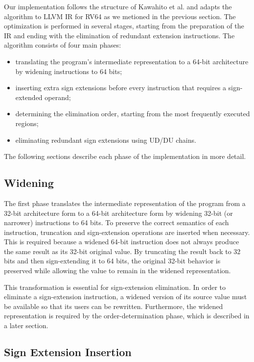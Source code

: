 \noindent Our implementation follows the structure of Kawahito et al. and adapts the algorithm to LLVM IR for RV64 as we metioned in the previous section. The optimization is performed in several stages, starting from the preparation of the IR and ending with the elimination of redundant extension instructions. The algorithm consists of four main phases:

\begin{itemize}
\item[--] translating the program's intermediate representation to a 64-bit
  architecture by widening instructions to 64 bits;
\item[--] inserting extra sign extensions before every instruction that requires
  a sign-extended operand;
\item[--] determining the elimination order, starting from the most frequently
  executed regions;
\item[--] eliminating redundant sign extensions using UD/DU chains.
\end{itemize}
The following sections describe each phase of the implementation in more detail.

\subsection{Widening}

The first phase translates the intermediate representation of the program from a 32-bit architecture form to a 64-bit architecture form by widening 32-bit (or narrower) instructions to 64 bits. To preserve the correct semantics of each instruction, truncation and sign-extension operations are inserted when necessary. This is required because a widened 64-bit instruction does not always produce the same result as its 32-bit original value. By truncating the result back to 32 bits and then sign-extending it to 64 bits, the original 32-bit behavior is preserved while allowing the value to remain in the widened representation.

This transformation is essential for sign-extension elimination. In order to eliminate a sign-extension instruction, a widened version of its source value must be available so that its users can be rewritten. Furthermore, the widened representation is required by the order-determination phase, which is described in a later section.



\subsection{Sign Extension Insertion}

